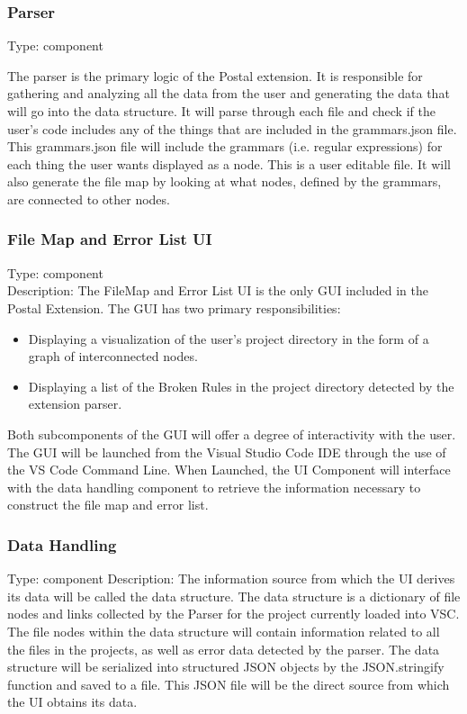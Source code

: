 \documentclass[letterpaper,10pt,titlepage,draftclsnofoot,onecolumn,onesided] {IEEEtran}
\begin{document}
	\subsubsection{Parser}
	
	Type: component
	
	The parser is the primary logic of the Postal extension. 
	It is responsible for gathering and analyzing all the data from the user and generating the data that will go into the data structure.
	It will parse through each file and check if the user's code includes any of the things that are included in the grammars.json file.
	This grammars.json file will include the grammars (i.e. regular expressions) for each thing the user wants displayed as a node.
	This is a user editable file.
	It will also generate the file map by looking at what nodes, defined by the grammars, are connected to other nodes.
		
	
	\subsubsection{File Map and Error List UI}
	Type: component
	\\
	Description: The FileMap and Error List UI is the only GUI included in the Postal Extension. 
	The GUI has two primary responsibilities: 
	\begin{itemize}
	\item Displaying a visualization of the user's project directory in the form of a graph of interconnected nodes.
	\item Displaying a list of the Broken Rules in the project directory detected by the extension parser.
	\end{itemize}
	Both subcomponents of the GUI will offer a degree of interactivity with the user. 
	The GUI will be launched from the Visual Studio Code IDE through the use of the VS Code Command Line.
	When Launched, the UI Component will interface with the data handling component to retrieve the information necessary to construct the file map and error list.

	
	\subsubsection{Data Handling} 
	Type: component
	Description: The information source from which the UI derives its data will be called the data structure. 
	The data structure is a dictionary of file nodes and links collected by the Parser for the project currently loaded into VSC. 
	The file nodes within the data structure will contain information related to all the files in the projects, as well as error data detected by the parser.
	The data structure will be serialized into structured JSON objects by the JSON.stringify function and saved to a file. \cite{stringify}
	This JSON file will be the direct source from which the UI obtains its data.
\end{document}
